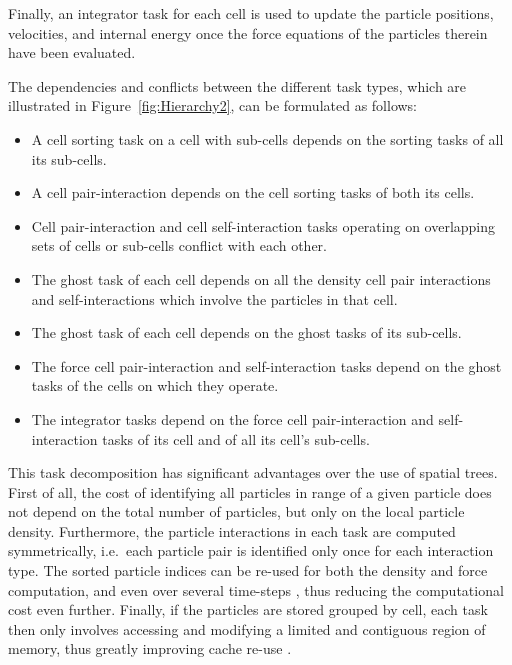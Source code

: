\documentclass[final]{siamltex}
\newcommand{\fig}[1]
    {Figure~\ref{fig:#1}}
\begin{document}
Finally, an integrator task for each cell is used to update the
particle positions, velocities, and internal energy once the force
equations of the particles therein have been evaluated.

The dependencies and conflicts between the different task types,
which are illustrated in \fig{Hierarchy2},
can be formulated as follows:

\begin{itemize}

    \item A cell sorting task on a cell with sub-cells depends
        on the sorting tasks of all its sub-cells.

    \item A cell pair-interaction depends on the cell sorting
        tasks of both its cells.
        
    \item Cell pair-interaction and cell self-interaction tasks
        operating on overlapping sets of cells or sub-cells
        conflict with each other.
        
    \item The ghost task of each cell depends on all the density cell pair
        interactions and self-interactions which involve the particles
        in that cell.
        
    \item The ghost task of each cell depends on the ghost tasks of
        its sub-cells.
        
    \item The force cell pair-interaction and self-interaction tasks
        depend on the ghost tasks of the cells on which they operate.
        
    \item The integrator tasks depend on the force cell pair-interaction
        and self-interaction tasks of its cell and of all its cell's
        sub-cells.

\end{itemize}

This task decomposition has significant advantages over the use of
spatial trees.
First of all, the cost of identifying all particles in range of
a given particle does not depend on the total number of
particles, but only on the local particle density.
Furthermore, the particle interactions in each task are computed
symmetrically, i.e.~each particle pair is identified only
once for each interaction type.
The sorted particle indices can be re-used for both the
density and force computation, and even over several time-steps
\cite{ref:Gonnet2013}, thus reducing the computational cost even
further.
Finally, if the particles are stored grouped by cell, each task
then only involves accessing and modifying a limited
and contiguous region of memory, thus greatly improving
cache re-use \cite{ref:Fomin2011}.
\end{document}
